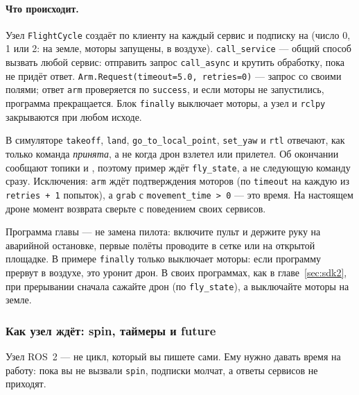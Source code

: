 \paragraph{Что происходит.} Узел \verb|FlightCycle| создаёт по клиенту на каждый сервис и подписку на  (число 0, 1 или 2: на земле, моторы запущены, в воздухе). \verb|call_service| --- общий способ вызвать любой сервис: отправить запрос \verb|call_async| и крутить обработку, пока не придёт ответ. \verb|Arm.Request(timeout=5.0, retries=0)| --- запрос со своими полями; ответ \verb|arm| проверяется по \verb|success|, и если моторы не запустились, программа прекращается. Блок \verb|finally| выключает моторы, а узел и \verb|rclpy| закрываются при любом исходе.

\begin{rulebox}
В симуляторе \verb|takeoff|, \verb|land|, \verb|go_to_local_point|, \verb|set_yaw| и \verb|rtl| отвечают, как только команда \emph{принята}, а не когда дрон взлетел или прилетел. Об окончании сообщают топики  и , поэтому пример ждёт \verb|fly_state|, а не следующую команду сразу. Исключения: \verb|arm| ждёт подтверждения моторов (по \verb|timeout| на каждую из \verb|retries + 1| попыток), а \verb|grab| с \verb|movement_time > 0| --- это время. На настоящем дроне момент возврата сверьте с поведением своих сервисов.
\end{rulebox}

\begin{warnbox}[Безопасность]
Программа главы --- не замена пилота: включите пульт и держите руку на аварийной остановке, первые полёты проводите в сетке или на открытой площадке. В примере \verb|finally| только выключает моторы: если программу прервут в воздухе, это уронит дрон. В своих программах, как в главе~\ref{sec:sdk2}, при прерывании сначала сажайте дрон (по \verb|fly_state|), а выключайте моторы на земле.
\end{warnbox}

\subsubsection*{Как узел ждёт: spin, таймеры и future}

Узел ROS~2 --- не цикл, который вы пишете сами. Ему нужно давать время на работу: пока вы не вызвали \verb|spin|, подписки молчат, а ответы сервисов не приходят.

